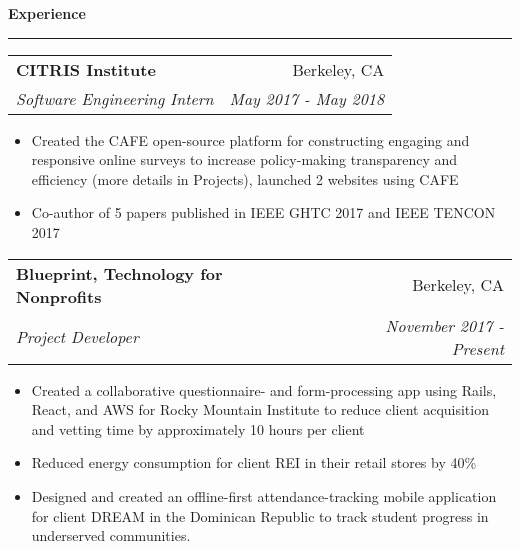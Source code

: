 \documentclass[11pt,letterpaper]{article}
\makeatletter
\newenvironment{topic}[1]
    {
    {\Large \centerline{#1}}
    \vspace*{0.03in}
    \hrule 
    \vspace*{0.05in}
    }
    {}
\newenvironment{event}
    {
    \begin{tabular*}{\textwidth}{l@{\extracolsep{\fill}}r}
    }
    {
    \end{tabular*}
    }
\makeatother
\begin{document}
\begin{topic}{\textbf{Experience}}
        \begin{event}
            \textbf{CITRIS Institute} & Berkeley, CA \\
            \emph{Software Engineering Intern} & \emph{May 2017 - May 2018}
        \end{event}
            \begin{itemize}
                \item Created the CAFE open-source platform for constructing engaging and responsive online surveys to increase policy-making transparency and efficiency (more details in Projects), launched 2 websites using CAFE
                \item Co-author of 5 papers published in IEEE GHTC 2017 and IEEE TENCON 2017
            \end{itemize}


        \begin{event}
            \textbf{Blueprint, Technology for Nonprofits} & Berkeley, CA \\
            \emph{Project Developer} & \emph{November 2017 - Present}
        \end{event}
            \begin{itemize}
                \item Created a collaborative questionnaire- and form-processing app using Rails, React, and AWS for Rocky Mountain Institute to reduce client acquisition and vetting time by approximately 10 hours per client
                \item Reduced energy consumption for client REI in their retail stores by 40\% 
                \item Designed and created an offline-first attendance-tracking mobile application for client DREAM in the Dominican Republic to track student progress in underserved communities.
            \end{itemize}


\end{topic}
\end{document}
